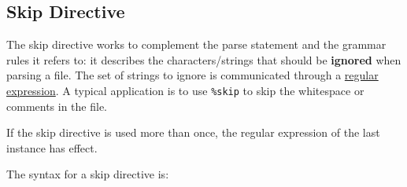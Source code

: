 
\subsection{Skip Directive}
{
	The skip directive works to complement the parse statement and the
	grammar rules it refers to: it describes the characters/strings that
	should be \textbf{ignored} when parsing a file. The set of strings to
	ignore is communicated through a \hyperref[sec:regex]{regular expression}.
	A typical application is to use \texttt{\%skip} to skip the whitespace
	or comments in the file.
	
	If the skip directive is used more than once, the regular expression of
	the last instance has effect.
	
	The syntax for a skip directive is:
	\begin{lstlisting}[numbers = none, texcl = true, language = MAIA]
%skip: <regular-expression>;
	\end{lstlisting}
}
